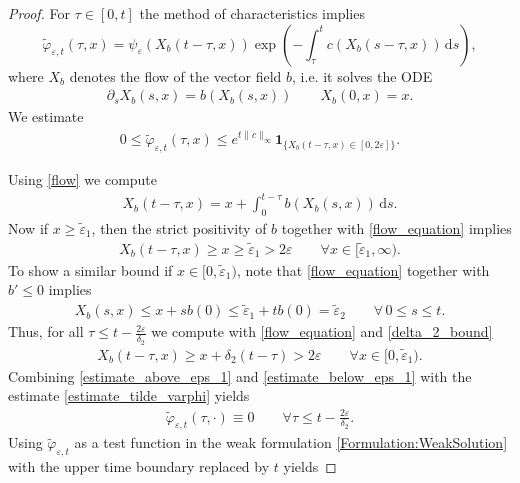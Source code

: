 \documentclass[10pt,a4paper]{amsart}
\newcommand{\ud}{\mathrm{d}}
\begin{document}
\begin{proof}
\noindent For $\tau\in [0,t]$ the method of characteristics implies
\[
\tilde \varphi_{\varepsilon,t}(\tau,x)
=
\psi_\varepsilon(X_b(t-\tau,x))
\exp\!\left(
-\int_\tau^t
c(X_b(s-\tau,x))\,\ud s
\right),
\]
where $X_b$ denotes the flow of the vector field $b$, i.e. it solves the ODE
	\begin{align}
    \label{flow}
	\partial_s X_b(s,x) = b(X_b(s, x)) \quad \quad X_b(0, x) = x.
	\end{align}
We estimate
\begin{align}
\label{estimate_tilde_varphi}
0\le
\tilde \varphi_{\varepsilon,t}(\tau,x)
\le
e^{t\|c\|_\infty}
\mathbf 1_{\{X_b(t-\tau,x)\in[0,2\varepsilon]\}}.
\end{align}

\noindent
Using \eqref{flow} we compute
\begin{align}
\label{flow_equation}
X_b(t-\tau,x)=x+\int_0^{t-\tau}b(X_b(s,x))\,\ud s.
\end{align}
Now if $x\geq\tilde \varepsilon_1$, then the strict positivity of $b$ together with \eqref{flow_equation} implies 
    \begin{align}
    \label{estimate_above_eps_1}
        X_b(t-\tau,x)\geq x\geq\tilde \varepsilon_1>2\varepsilon\qquad \forall x\in [\tilde\varepsilon_1,\infty).
    \end{align}
To show a similar bound if  $x\in[0,\tilde\varepsilon_1)$, note that  \eqref{flow_equation}  together with $b'\leq 0$ implies 
\begin{align*}
    X_b(s,x)\leq x+sb(0)\leq \tilde \varepsilon_1+tb(0)=\tilde \varepsilon_2\qquad \forall \,0\leq s\leq t.
    \end{align*}
Thus, for all $\tau\leq t-\frac {2\varepsilon}{\delta_2}$ we compute with \eqref{flow_equation} and \eqref{delta_2_bound}
\begin{align}
\label{estimate_below_eps_1}
X_b(t-\tau,x)\ge x+\delta_2(t-\tau)>2\varepsilon\qquad \forall x\in [0,\tilde \varepsilon_1).
\end{align}
Combining  \eqref{estimate_above_eps_1} and \eqref{estimate_below_eps_1} with the estimate \eqref{estimate_tilde_varphi} yields
    \begin{align*} 
\tilde \varphi_{\varepsilon,t}(\tau,\cdot)\equiv0 \qquad \forall \tau\leq t-\frac {2\varepsilon} {\delta_2}.
    \end{align*}
\noindent Using $\tilde \varphi_{\varepsilon,t}$ as a test function in the weak
formulation \eqref{Formulation:WeakSolution} with the upper time boundary replaced by $t$  yields

\end{proof}
\end{document}
